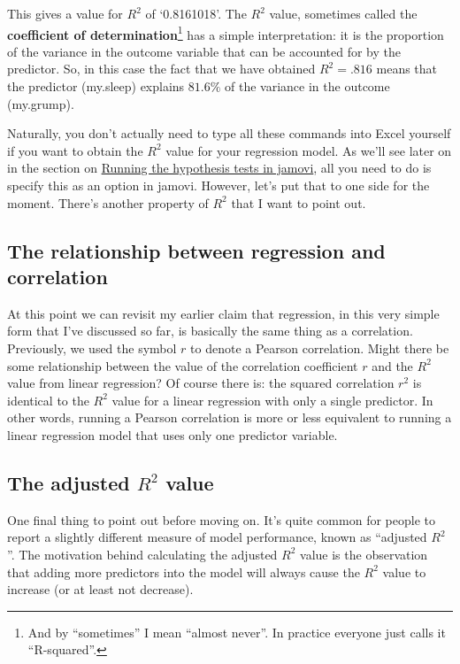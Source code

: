 \documentclass[
  a4paper,
]{book}
\begin{document}
This gives a value for \(R^2\) of `0.8161018'. The \(R^2\) value,
sometimes called the \textbf{coefficient of determination}\footnote{And
  by ``sometimes'' I mean ``almost never''. In practice everyone just
  calls it ``R-squared''.} has a simple interpretation: it is the
proportion of the variance in the outcome variable that can be accounted
for by the predictor. So, in this case the fact that we have obtained
\(R^2 = .816\) means that the predictor (my.sleep) explains \(81.6\%\)
of the variance in the outcome (my.grump).

Naturally, you don't actually need to type all these commands into Excel
yourself if you want to obtain the \(R^2\) value for your regression
model. As we'll see later on in the section on
\protect\hyperlink{running-the-hypothesis-tests-in-jamovi}{Running the
hypothesis tests in jamovi}, all you need to do is specify this as an
option in jamovi. However, let's put that to one side for the moment.
There's another property of \(R^2\) that I want to point out.

\hypertarget{the-relationship-between-regression-and-correlation}{%
\subsection{The relationship between regression and
correlation}\label{the-relationship-between-regression-and-correlation}}

At this point we can revisit my earlier claim that regression, in this
very simple form that I've discussed so far, is basically the same thing
as a correlation. Previously, we used the symbol \(r\) to denote a
Pearson correlation. Might there be some relationship between the value
of the correlation coefficient \(r\) and the \(R^2\) value from linear
regression? Of course there is: the squared correlation \(r^2\) is
identical to the \(R^2\) value for a linear regression with only a
single predictor. In other words, running a Pearson correlation is more
or less equivalent to running a linear regression model that uses only
one predictor variable.

\hypertarget{the-adjusted-r2-value}{%
\subsection{\texorpdfstring{The adjusted \(R^2\)
value}{The adjusted R\^{}2 value}}\label{the-adjusted-r2-value}}

One final thing to point out before moving on. It's quite common for
people to report a slightly different measure of model performance,
known as ``adjusted \(R^2\)''. The motivation behind calculating the
adjusted \(R^2\) value is the observation that adding more predictors
into the model will always cause the \(R^2\) value to increase (or at
least not decrease).
\end{document}
